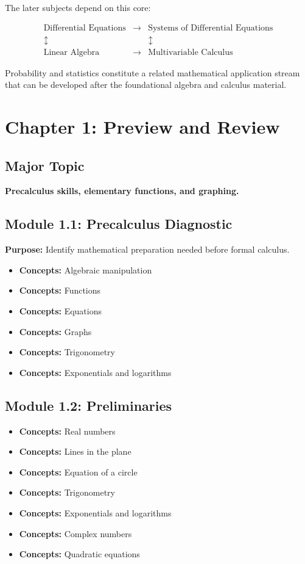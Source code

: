 \documentclass[11pt]{article}
\newcommand{\concept}[1]{\item \textbf{Concepts:} #1}
\begin{document}
The later subjects depend on this core:

\[
\begin{array}{ccccc}
\text{Differential Equations}
&\longrightarrow&
\text{Systems of Differential Equations}
\\
\updownarrow
&&
\updownarrow
\\
\text{Linear Algebra}
&\longrightarrow&
\text{Multivariable Calculus}
\end{array}
\]

Probability and statistics constitute a related mathematical
application stream that can be developed after the foundational
algebra and calculus material.


\section{Chapter 1: Preview and Review}

\subsection{Major Topic}

\textbf{Precalculus skills, elementary functions, and graphing.}

\subsection{Module 1.1: Precalculus Diagnostic}

\textbf{Purpose:} Identify mathematical preparation needed before
formal calculus.

\begin{itemize}
    \concept{Algebraic manipulation}
    \concept{Functions}
    \concept{Equations}
    \concept{Graphs}
    \concept{Trigonometry}
    \concept{Exponentials and logarithms}
\end{itemize}

\subsection{Module 1.2: Preliminaries}

\begin{itemize}
    \concept{Real numbers}
    \concept{Lines in the plane}
    \concept{Equation of a circle}
    \concept{Trigonometry}
    \concept{Exponentials and logarithms}
    \concept{Complex numbers}
    \concept{Quadratic equations}
\end{itemize}
\end{document}
